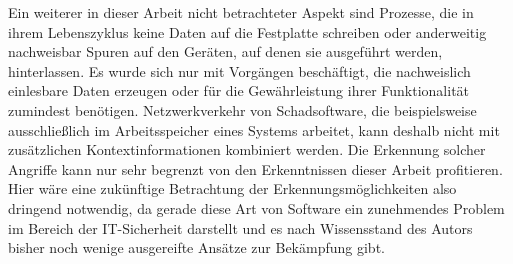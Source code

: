 Ein weiterer in dieser Arbeit nicht betrachteter Aspekt sind Prozesse, die in ihrem Lebenszyklus keine Daten auf die Festplatte schreiben oder anderweitig nachweisbar Spuren auf den Geräten, auf denen sie ausgeführt werden, hinterlassen. Es wurde sich nur mit Vorgängen beschäftigt, die nachweislich einlesbare Daten erzeugen oder für die Gewährleistung ihrer Funktionalität zumindest benötigen. Netzwerkverkehr von Schadsoftware, die beispielsweise ausschließlich im Arbeitsspeicher eines Systems arbeitet, kann deshalb nicht mit zusätzlichen Kontextinformationen kombiniert werden. Die Erkennung solcher Angriffe kann nur sehr begrenzt von den Erkenntnissen dieser Arbeit profitieren. Hier wäre eine zukünftige Betrachtung der Erkennungsmöglichkeiten also dringend notwendig, da gerade diese Art von Software ein zunehmendes Problem im Bereich der IT-Sicherheit darstellt und es nach Wissensstand des Autors bisher noch wenige ausgereifte Ansätze zur Bekämpfung gibt.
